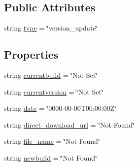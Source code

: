 \subsection*{Public Attributes}
\begin{DoxyCompactItemize}
\item 
string \mbox{\hyperlink{class_little_weeb_library_1_1_models_1_1_json_version_info_a7a9fcfe7b1424766248cd523a28e48d0}{type}} = \char`\"{}version\+\_\+update\char`\"{}
\end{DoxyCompactItemize}
\subsection*{Properties}
\begin{DoxyCompactItemize}
\item 
string \mbox{\hyperlink{class_little_weeb_library_1_1_models_1_1_json_version_info_adb75e140a3dcc76b8ca6c1dd3c0f060a}{currentbuild}} = \char`\"{}Not Set\char`\"{}
\item 
string \mbox{\hyperlink{class_little_weeb_library_1_1_models_1_1_json_version_info_a9a74ca950016eb93a1ecb4d9089d9f2c}{currentversion}} = \char`\"{}Not Set\char`\"{}
\item 
string \mbox{\hyperlink{class_little_weeb_library_1_1_models_1_1_json_version_info_a836f97d258ddad4ab351b8cd06730914}{date}} = \char`\"{}0000-\/00-\/00\+T00\+:00\+:00\+Z\char`\"{}
\item 
string \mbox{\hyperlink{class_little_weeb_library_1_1_models_1_1_json_version_info_a758349b498e2f9d827d229bfaff9414d}{direct\+\_\+download\+\_\+url}} = \char`\"{}Not Found\char`\"{}
\item 
string \mbox{\hyperlink{class_little_weeb_library_1_1_models_1_1_json_version_info_a71865be74ad7d0a178a81b708ea85d25}{file\+\_\+name}} = \char`\"{}Not Found\char`\"{}
\item 
string \mbox{\hyperlink{class_little_weeb_library_1_1_models_1_1_json_version_info_abb2527c1c41e946dd71fe862a48a5f0f}{newbuild}} = \char`\"{}Not Found\char`\"{}

\end{DoxyCompactItemize}
